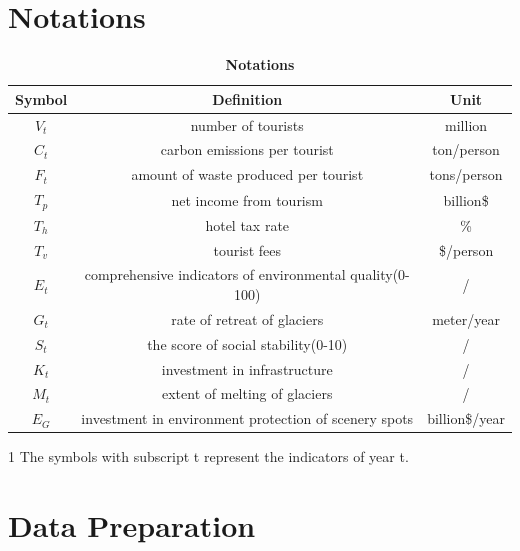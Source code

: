 \documentclass{mcmthesis}
\begin{document}
\section{Notations}
\begin{table}[H]
  \caption{\textbf{Notations}}
  \centering
  \begin{threeparttable}
    \begin{tabular}{ccc}
      \toprule
        Symbol\tnote{1} & Definition & Unit \\
      \midrule
        $V_t$ & number of tourists & million \\ 
        $C_t$ & carbon emissions per tourist & ton/person \\
        $F_t$ & amount of waste produced per tourist & tons/person \\

        $T_p$ & net income from tourism & billion\$ \\
        $T_h$ & hotel tax rate & \% \\
        $T_v$ & tourist fees & \$/person \\

        $E_t$ & comprehensive indicators of environmental quality(0-100) & / \\
        $G_t$ & rate of retreat of glaciers & meter/year \\

        $S_t$ & the score of social stability(0-10) & / \\ 
        $K_t$ & investment in infrastructure & / \\

        $M_t$ & extent of melting of glaciers & / \\
        $E_G$ & investment in environment protection of scenery spots & billion\$/year \\
        \bottomrule
    \end{tabular}
    \begin{tablenotes}
    \footnotesize
      \item[1] The symbols with subscript t represent the indicators of year t.
    \end{tablenotes}
  \end{threeparttable}
\end{table}

\section{Data Preparation}
\end{document}

